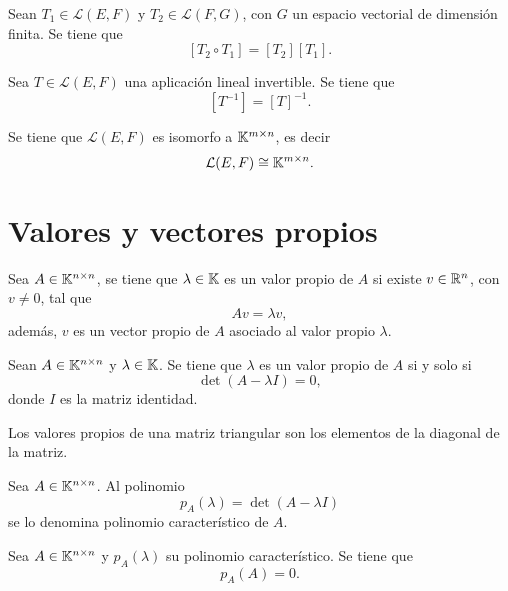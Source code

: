 \documentclass[a4,11pt]{aleph-notas}
\begin{document}
\begin{teo}
    Sean $T_1 \in \mathcal{L}(E,F)$ y $T_2\in\mathcal{L}(F,G)$, con $G$ un espacio vectorial de dimensión finita. Se tiene que
    \[
        [T_2\circ T_1] = [T_2][T_1].
    \]
\end{teo}


\begin{teo}
    Sea $T\in \mathcal{L}(E,F)$ una aplicación lineal invertible. Se tiene que
    \[
        [T^{-1}] = [T]^{-1}.
    \]
\end{teo}


\begin{teo}
    Se tiene que $\mathcal{L}(E,F)$ es isomorfo a $\Mat[\K]{m}{n}$, es decir
    \[
        \mathcal{L}(E,F)
        \cong
        \Mat[\K]{m}{n}.
    \]
\end{teo}

\section{Valores y vectores propios}

\begin{defi}
    Sea $A\in \Mat[\K]{n}{n}$, se tiene que $\lambda\in \K$ es un valor propio de $A$ si existe $v\in \R^n$, con $v\neq 0$, tal que
    \[
        Av = \lambda v,
    \]
    además, $v$ es un vector propio de $A$ asociado al valor propio $\lambda$.
\end{defi}


\begin{teo}
   Sean $A\in \Mat[\K]{n}{n}$ y $\lambda \in \K$. Se tiene que $\lambda$ es un valor propio de $A$ si y solo si
   \[
        \det(A - \lambda I) = 0,
   \]
   donde $I$ es la matriz identidad.
\end{teo}

\begin{teo}
    Los valores propios de una matriz triangular son los elementos de la diagonal de la matriz. 
\end{teo}


\begin{defi}
    Sea $A\in \Mat[\K]{n}{n}$. Al polinomio
    \[
        p_A(\lambda) = \det(A - \lambda I)
    \]
    se lo denomina polinomio característico de $A$.
\end{defi}


\begin{teo}
    Sea $A\in \Mat[\K]{n}{n}$ y $p_A(\lambda)$ su polinomio característico. Se tiene que
    \[
        p_A(A) = 0.
    \]
\end{teo}
\end{document}
